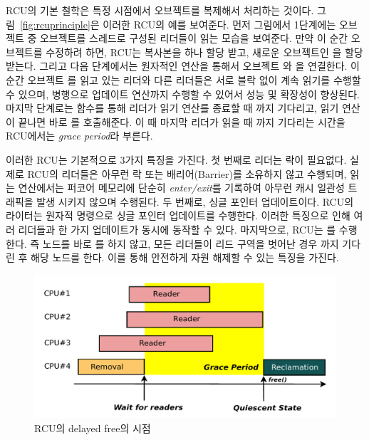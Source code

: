 RCU의 기본 철학은 특정 시점에서 오브젝트를 복제해서 처리하는 것이다. 
그림~\ref{fig:rcuprinciple}은 이러한 RCU의 예를 보여준다.
먼저 그림에서 1단계에는  오브젝트 중  오브젝트를 스레드로 구성된 
리더들이 읽는 모습을 보여준다.
만약 이 순간  오브젝트를 수정하려 하면, RCU는 복사본을 하나 할당 받고, 새로운 오브젝트인 을 할당 
받는다.
그리고 다음 단계에서는 원자적인 연산을 통해서 오브젝트 와 을 연결한다. 
이 순간 오브젝트 를 읽고 있는 리더와 다른 리더들은 서로 블락 없이 계속 읽기를 수행할 수 있으며, 
병행으로 업데이트 연산까지 수행할 수 있어서 성능 및 확장성이 향상된다.
마지막 단계로는  함수를 통해 리더가 읽기 연산를 종료할 때 까지 기다리고, 읽기 연산이
끝나면 바로 를 호출해준다. 
이 때 마지막 리더가 읽을 때 까지 기다리는 시간을 RCU에서는 \textit{grace period}라 부른다.

이러한 RCU는 기본적으로 3가지 특징을 가진다. 
첫 번째로 리더는 락이 필요없다.
실제로 RCU의 리더들은 아무런 락 또는 배리어(Barrier)를 소유하지 않고 수행되며, 읽는 연산에서는 
퍼코어 메모리에 단순히 \textit{enter/exit}를 기록하여 아무런 캐시 일관성 트래픽을 발생 시키지 않으며 수행된다.
두 번째로, 싱글 포인터 업데이트이다.
RCU의 라이터는 원자적 명령으로 싱글 포인터 업데이트를 수행한다.
이러한 특징으로 인해 여러 리더들과 한 가지 업데이트가 동시에 동작할 수 있다.  
마지막으로, RCU는 를 수행한다.
즉 노드를 바로 를 하지 않고, 모든 리더들이 리드 구역을 벗어난 경우 까지 기다린 후 
해당 노드를 한다.
이를 통해 안전하게 자원 해제할 수 있는 특징을 가진다.

\begin{figure}[h]
    \centering
    \includegraphics[width=1\textwidth]{fig/rcu/rcu_grace}
    \caption{RCU의 delayed free의 시점}
  \label{fig:rcu_grace}
\end{figure}

